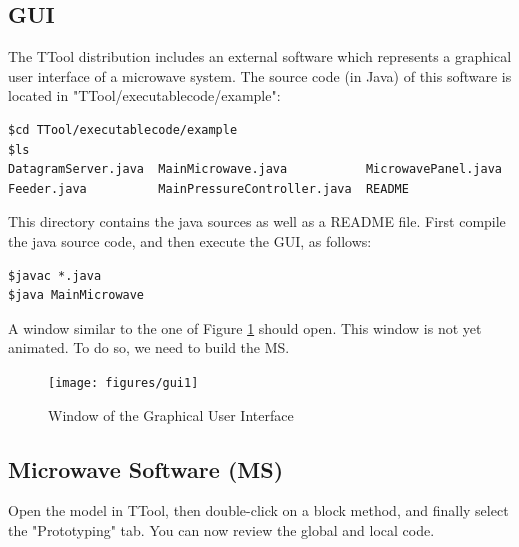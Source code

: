 \documentclass[12pt]{article}
\begin{document}
\subsection{GUI}
The TTool distribution includes an external software which represents a graphical user interface of a microwave system. The source code (in Java) of this software is located in "TTool/executablecode/example":
\begin{lstlisting}
$cd TTool/executablecode/example
$ls
DatagramServer.java  MainMicrowave.java           MicrowavePanel.java
Feeder.java          MainPressureController.java  README
\end{lstlisting}
This directory contains the java sources as well as a README file. First compile the java source code, and then execute the GUI, as follows:
\begin{lstlisting}
$javac *.java
$java MainMicrowave
\end{lstlisting}
A window similar to the one of Figure \ref{fig:gui1} should open. This window is not yet animated. To do so, we need to build the MS.

\begin{figure}[htbp]
\centering
\texttt{[image: figures/gui1]}
\caption{Window of the Graphical User Interface} \label{fig:gui1}
\end{figure}

\subsection{Microwave Software (MS)}
Open the model in TTool, then double-click on a block method, and finally select the "Prototyping" tab. You can now review the global and local code.
\end{document}

